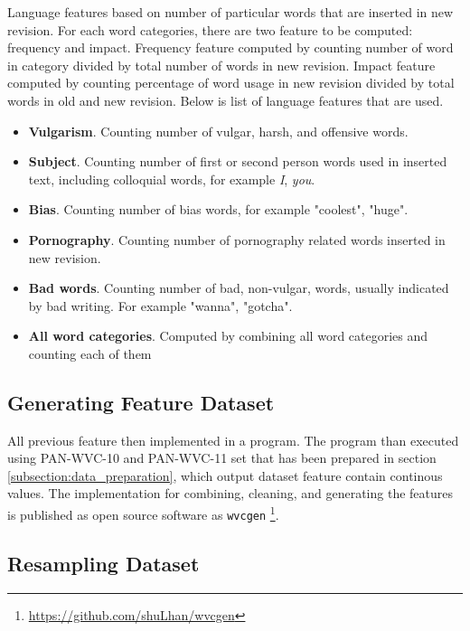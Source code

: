 \documentclass[conference,compsoc,a4paper,twocolumn,final]{IEEEtran}
\begin{document}
Language features based on number of particular words that are inserted in new
revision.
For each word categories, there are two feature to be computed: frequency and
impact.
Frequency feature computed by counting number of word in category divided by
total number of words in new revision.
Impact feature computed by counting percentage of word usage in new revision
divided by total words in old and new revision.
Below is list of language features that are used.

\begin{itemize}
\item \textbf{Vulgarism}. Counting number of vulgar, harsh, and offensive
words.
\item \textbf{Subject}. Counting number of first or second person
words used in inserted text, including colloquial words, for example
\textit{I}, \textit{you}.
\item \textbf{Bias}. Counting number of bias words, for example "coolest",
"huge".
\item \textbf{Pornography}. Counting number of pornography related words
inserted in new revision.
\item \textbf{Bad words}. Counting number of bad, non-vulgar, words, usually
indicated by bad writing. For example "wanna", "gotcha".
\item \textbf{All word categories}. Computed by combining all word categories
and counting each of them
\end{itemize}


\subsection{Generating Feature Dataset}

All previous feature then implemented in a program.
The program than executed using PAN-WVC-10 and PAN-WVC-11 set that has been
prepared in section \ref{subsection:data_preparation}, which output dataset
feature contain continous values.
The implementation for combining, cleaning, and generating the features is
published as open source software as \texttt{wvcgen}
\footnote{\url{https://github.com/shuLhan/wvcgen}}.


\subsection{Resampling Dataset}
\end{document}
